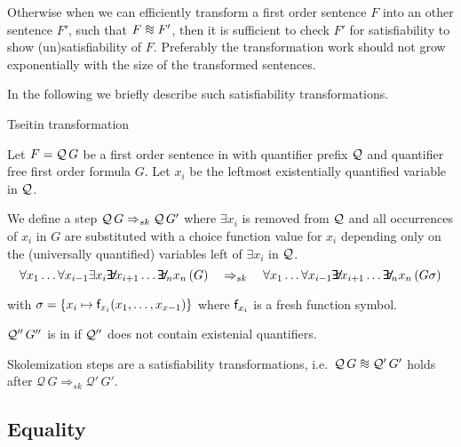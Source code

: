 	Otherwise when we can efficiently transform 
	a first order sentence \( F \) 
	into an other sentence \( F' \),
	such that \( F \equisat F' \),
	then it is sufficient to check \( F' \) 
	for satisfiability to show (un)satisfiability of \( F\).
	Preferably the transformation work should not grow exponentially with 
	the size of the transformed sentences.

In the following we briefly describe such satisfiability transformations.

\begin{definition}\label{def:tseitin}
	Tseitin transformation
\end{definition}

\begin{definition}\label{def:skolemization}
	Let \( F = \mathcal{Q}\,G \) be a first order sentence in \PNF
	with quantifier prefix \( \mathcal{Q} \) and quantifier free first order formula \( G \). 
	Let \( x_i \) be the leftmost existentially quantified variable in \( \mathcal{Q} \).
	
	We define a  step \( \mathcal{Q}\,G \Rightarrow_{sk} \mathcal{Q}\,G' \)
	where \( \exists x_i \) is removed from \( \mathcal{Q} \)
	and
	all occurrences of \( x_i \) in \( G \) are substituted
	with a choice function value for \( x_i \) depending only
	on the (universally quantified) variables left of \( \exists x_i \) in \( \mathcal{Q} \).
	\[
		\forall x_1 \ldots \forall x_{i-1}
		\exists x_i 
		\quantify x_{i+1} \ldots \quantify_n x_n\, (G)
% 
		\quad \Rightarrow_{sk} \quad
% 
		\forall x_1 \ldots \forall x_{i-1}
		\quantify x_{i+1} \ldots \quantify_n x_n\, (G\sigma)
	\]

	with \( \sigma = \{ x_i \mapsto \mathsf{f}_{x_i}(x_1,\ldots, x_{x-1}) \} \)
	where \( \mathsf{f}_{x_i} \) is a fresh function symbol.

	\( \mathcal{Q}''\,G'' \) is in  if \( \mathcal{Q}'' \)
	does not contain existenial quantifiers.
\end{definition}

\begin{lemma}
	Skolemization steps are a satisfiability transformations, 
	i.e.~\( \mcQ\,G \equisat \mcQ'\,G' \)
	holds after 
	\( \mathcal{Q}\,G \Rightarrow_{sk} \mathcal{Q}'\,G' \).
\end{lemma}



\subsection{Equality}

